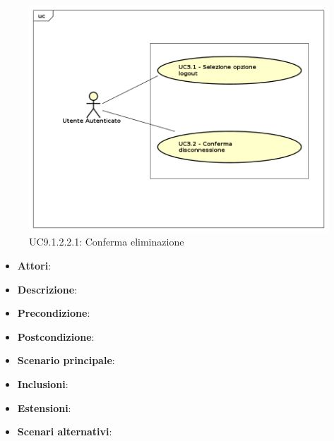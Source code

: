 				\label{UC9.1.2.2.1}
				\begin{figure}[h]
					\centering
				\includegraphics[scale=0.7,keepaspectratio]{UML/UC9.png}
					\caption{UC9.1.2.2.1: Conferma eliminazione}
				\end{figure}
				\FloatBarrier
				\begin{itemize}
					\item \textbf{Attori}: 
					\item \textbf{Descrizione}: 
					\item \textbf{Precondizione}: 
					\item \textbf{Postcondizione}: 
					\item \textbf{Scenario principale}:
					\item \textbf{Inclusioni}:
					\item \textbf{Estensioni}:
					\item \textbf{Scenari alternativi}:
				\end{itemize}
				
